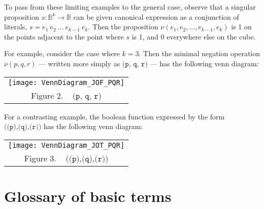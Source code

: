 \documentclass[12pt]{article}
\begin{document}
To pass from these limiting examples to the general case, observe that a singular proposition $s : \mathbb{B}^k \to \mathbb{B}$ can be given canonical expression as a conjunction of literals, $s = e_1 ~ e_2 ~\ldots~ e_{k-1} ~ e_k$.  Then the proposition $\nu(e_1, e_2, \ldots, e_{k-1}, e_k)$ is 1 on the points adjacent to the point where $s$ is 1, and 0 everywhere else on the cube.

For example, consider the case where $k = 3$.  Then the minimal negation operation $\nu(p, q, r)$ --- written more simply as $\texttt{(p, q, r)}$ --- has the following venn diagram:

\begin{center}\begin{tabular}{c}
\texttt{[image: VennDiagram\_JOF\_PQR]}
\\
Figure 2. ~ $\texttt{(p, q, r)}$
\end{tabular}\end{center}

For a contrasting example, the boolean function expressed by the form $\texttt{((p),(q),(r))}$ has the following venn diagram:

\begin{center}\begin{tabular}{c}
\texttt{[image: VennDiagram\_JOT\_PQR]}
\\
Figure 3. ~ $\texttt{((p),(q),(r))}$
\end{tabular}\end{center}

\section{Glossary of basic terms}
\end{document}
